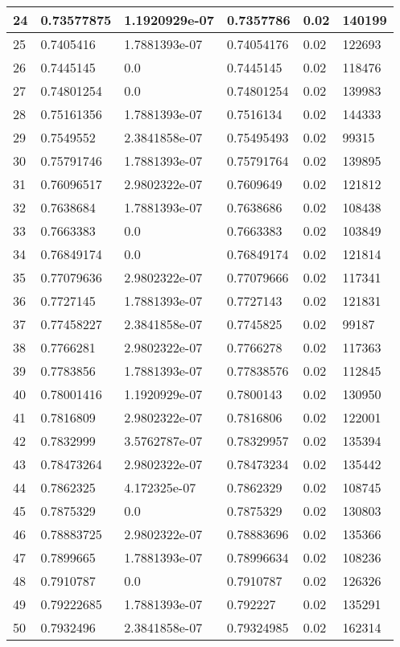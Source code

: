 \begin{longtable}{|l|l|l|l|l|l|}
24 & 0.73577875 & 1.1920929e-07 & 0.7357786 & 0.02 & 140199 \\ \hline 
25 & 0.7405416 & 1.7881393e-07 & 0.74054176 & 0.02 & 122693 \\ \hline 
26 & 0.7445145 & 0.0 & 0.7445145 & 0.02 & 118476 \\ \hline 
27 & 0.74801254 & 0.0 & 0.74801254 & 0.02 & 139983 \\ \hline 
28 & 0.75161356 & 1.7881393e-07 & 0.7516134 & 0.02 & 144333 \\ \hline 
29 & 0.7549552 & 2.3841858e-07 & 0.75495493 & 0.02 & 99315 \\ \hline 
30 & 0.75791746 & 1.7881393e-07 & 0.75791764 & 0.02 & 139895 \\ \hline 
31 & 0.76096517 & 2.9802322e-07 & 0.7609649 & 0.02 & 121812 \\ \hline 
32 & 0.7638684 & 1.7881393e-07 & 0.7638686 & 0.02 & 108438 \\ \hline 
33 & 0.7663383 & 0.0 & 0.7663383 & 0.02 & 103849 \\ \hline 
34 & 0.76849174 & 0.0 & 0.76849174 & 0.02 & 121814 \\ \hline 
35 & 0.77079636 & 2.9802322e-07 & 0.77079666 & 0.02 & 117341 \\ \hline 
36 & 0.7727145 & 1.7881393e-07 & 0.7727143 & 0.02 & 121831 \\ \hline 
37 & 0.77458227 & 2.3841858e-07 & 0.7745825 & 0.02 & 99187 \\ \hline 
38 & 0.7766281 & 2.9802322e-07 & 0.7766278 & 0.02 & 117363 \\ \hline 
39 & 0.7783856 & 1.7881393e-07 & 0.77838576 & 0.02 & 112845 \\ \hline 
40 & 0.78001416 & 1.1920929e-07 & 0.7800143 & 0.02 & 130950 \\ \hline 
41 & 0.7816809 & 2.9802322e-07 & 0.7816806 & 0.02 & 122001 \\ \hline 
42 & 0.7832999 & 3.5762787e-07 & 0.78329957 & 0.02 & 135394 \\ \hline 
43 & 0.78473264 & 2.9802322e-07 & 0.78473234 & 0.02 & 135442 \\ \hline 
44 & 0.7862325 & 4.172325e-07 & 0.7862329 & 0.02 & 108745 \\ \hline 
45 & 0.7875329 & 0.0 & 0.7875329 & 0.02 & 130803 \\ \hline 
46 & 0.78883725 & 2.9802322e-07 & 0.78883696 & 0.02 & 135366 \\ \hline 
47 & 0.7899665 & 1.7881393e-07 & 0.78996634 & 0.02 & 108236 \\ \hline 
48 & 0.7910787 & 0.0 & 0.7910787 & 0.02 & 126326 \\ \hline 
49 & 0.79222685 & 1.7881393e-07 & 0.792227 & 0.02 & 135291 \\ \hline 
50 & 0.7932496 & 2.3841858e-07 & 0.79324985 & 0.02 & 162314 \\ \hline 
\end{longtable}